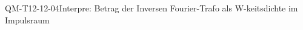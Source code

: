 
\begin{CONC}{QM-T12-12-04}{Interpre: Betrag der Inversen Fourier-Trafo als W-keitsdichte im Impulsraum}
\end{CONC}
